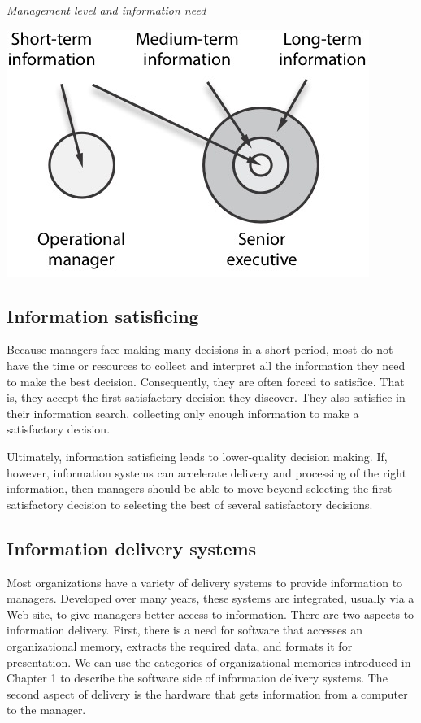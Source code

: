 \documentclass[
]{article}
\begin{document}
\emph{Management level and information need}

\includegraphics{Figures/Chapter 2/onion model.jpg}

\hypertarget{information-satisficing}{%
\subsection*{Information satisficing}\label{information-satisficing}}

Because managers face making many decisions in a short period, most do
not have the time or resources to collect and interpret all the
information they need to make the best decision. Consequently, they are
often forced to satisfice. That is, they accept the first satisfactory
decision they discover. They also satisfice in their information search,
collecting only enough information to make a satisfactory decision.

Ultimately, information satisficing leads to lower-quality decision
making. If, however, information systems can accelerate delivery and
processing of the right information, then managers should be able to
move beyond selecting the first satisfactory decision to selecting the
best of several satisfactory decisions.

\hypertarget{information-delivery-systems}{%
\subsection*{Information delivery systems}\label{information-delivery-systems}}

Most organizations have a variety of delivery systems to provide
information to managers. Developed over many years, these systems are
integrated, usually via a Web site, to give managers better access to
information. There are two aspects to information delivery. First, there
is a need for software that accesses an organizational memory, extracts
the required data, and formats it for presentation. We can use the
categories of organizational memories introduced in Chapter 1 to
describe the software side of information delivery systems. The second
aspect of delivery is the hardware that gets information from a computer
to the manager.
\end{document}
